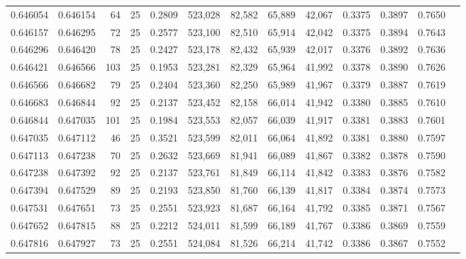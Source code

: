 \begin{tabular}{rrrrrrrrrrrrr}
0.646054 & 0.646154 &    64 &  25 &                                     0.2809 & 523,028 &  82,582 &  65,889 &  42,067 & 0.3375 & 0.3897 & 0.7650 \\
0.646157 & 0.646295 &    72 &  25 &                                     0.2577 & 523,100 &  82,510 &  65,914 &  42,042 & 0.3375 & 0.3894 & 0.7643 \\
0.646296 & 0.646420 &    78 &  25 &                                     0.2427 & 523,178 &  82,432 &  65,939 &  42,017 & 0.3376 & 0.3892 & 0.7636 \\
0.646421 & 0.646566 &   103 &  25 &                                     0.1953 & 523,281 &  82,329 &  65,964 &  41,992 & 0.3378 & 0.3890 & 0.7626 \\
0.646566 & 0.646682 &    79 &  25 &                                     0.2404 & 523,360 &  82,250 &  65,989 &  41,967 & 0.3379 & 0.3887 & 0.7619 \\
0.646683 & 0.646844 &    92 &  25 &                                     0.2137 & 523,452 &  82,158 &  66,014 &  41,942 & 0.3380 & 0.3885 & 0.7610 \\
0.646844 & 0.647035 &   101 &  25 &                                     0.1984 & 523,553 &  82,057 &  66,039 &  41,917 & 0.3381 & 0.3883 & 0.7601 \\
0.647035 & 0.647112 &    46 &  25 &                                     0.3521 & 523,599 &  82,011 &  66,064 &  41,892 & 0.3381 & 0.3880 & 0.7597 \\
0.647113 & 0.647238 &    70 &  25 &                                     0.2632 & 523,669 &  81,941 &  66,089 &  41,867 & 0.3382 & 0.3878 & 0.7590 \\
0.647238 & 0.647392 &    92 &  25 &                                     0.2137 & 523,761 &  81,849 &  66,114 &  41,842 & 0.3383 & 0.3876 & 0.7582 \\
0.647394 & 0.647529 &    89 &  25 &                                     0.2193 & 523,850 &  81,760 &  66,139 &  41,817 & 0.3384 & 0.3874 & 0.7573 \\
0.647531 & 0.647651 &    73 &  25 &                                     0.2551 & 523,923 &  81,687 &  66,164 &  41,792 & 0.3385 & 0.3871 & 0.7567 \\
0.647652 & 0.647815 &    88 &  25 &                                     0.2212 & 524,011 &  81,599 &  66,189 &  41,767 & 0.3386 & 0.3869 & 0.7559 \\
0.647816 & 0.647927 &    73 &  25 &                                     0.2551 & 524,084 &  81,526 &  66,214 &  41,742 & 0.3386 & 0.3867 & 0.7552 \\

\end{tabular}
